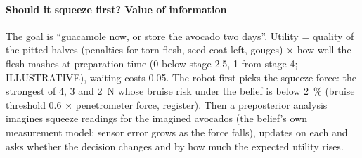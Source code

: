 \documentclass[10.5pt,a4paper]{article}
\begin{document}
\paragraph{Should it squeeze first? Value of information} The goal is ``guacamole now, or store the avocado two
days''. Utility = quality of the pitted halves (penalties for torn flesh, seed coat left, gouges) $\times$ how well
the flesh mashes at preparation time (0 below stage 2.5, 1 from stage 4; ILLUSTRATIVE), waiting costs 0.05. The robot
first picks the squeeze force: the strongest of 4, 3 and 2~N whose bruise risk under the belief is below 2~\% (bruise
threshold 0.6 $\times$ penetrometer force, register). Then a preposterior analysis imagines squeeze readings for the
imagined avocados (the belief's own measurement model; sensor error grows as the force falls), updates on each and
asks whether the decision changes and by how much the expected utility rises.
\end{document}
